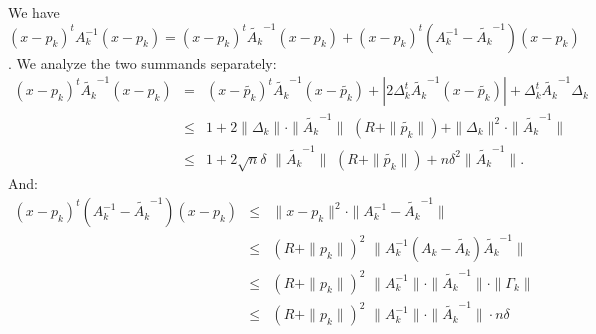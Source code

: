 \documentclass[12pt, showidx, twoside]{article}
\begin{document}
{{{We have 
$(x - p_k)^t A_k^{-1} (x - p_k) 
  =  (x - p_k)^t \tilde{A_k}^{-1} (x - p_k)  + (x - p_k)^t (A_k^{-1} - \tilde{A_k}^{-1}) (x - p_k)$.
We analyze the two summands separately:
\begin{equation} \label{eq::error_ellipsoid_1}
\begin{array}{rcl}
(x - p_k)^t \tilde{A_k}^{-1} (x - p_k) 
 & = & (x - \tilde{p_k})^t \tilde{A_k}^{-1} (x - \tilde{p_k}) + |2 \Delta_k^t\tilde{A_k}^{-1}(x - \tilde{p_k})|
       + \Delta_k^t \tilde{A_k}^{-1} \Delta_k\\
& \leq & 1 + 2 \|\Delta_k\| \cdot \| \tilde{A_k}^{-1}\|\,\, (R + \|\tilde{p_k}\|) + \|\Delta_k\|^2 \cdot \| \tilde{A_k}^{-1}\|\\
& \leq & 1 + 2 \sqrt{n}\delta\,\, \| \tilde{A_k}^{-1}\|\,\, (R + \|\tilde{p_k}\|) + n\delta^2  \| \tilde{A_k}^{-1}\|.
\end{array}
\end{equation}
And:
\begin{equation} \label{eq::error_ellipsoid_2}
\begin{array}{rcl}
(x - p_k)^t (A_k^{-1} - \tilde{A_k}^{-1}) (x - p_k) 
& \leq & \|x - p_k\|^2 \cdot \| A_k^{-1} - \tilde{A_k}^{-1} \| \\
& \leq & (R + \|p_k\|)^2 \,\, \| A_k^{-1} (A_k - \tilde{A_k}) \tilde{A_k}^{-1}\| \\
& \leq & (R + \|p_k\|)^2 \,\, \|A_k^{-1}\|\cdot \|\tilde{A_k}^{-1}\| \cdot \|\Gamma_k\| \\
& \leq & (R + \|p_k\|)^2 \,\, \|A_k^{-1}\|\cdot \|\tilde{A_k}^{-1}\| \cdot n \delta
\end{array}
\end{equation}





}}}
\end{document}
